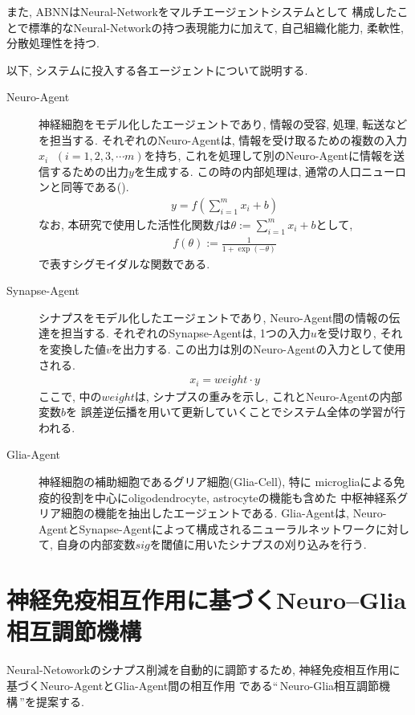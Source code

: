 また, ABNNはNeural-Networkをマルチエージェントシステムとして
構成したことで標準的なNeural-Networkの持つ表現能力に加えて, 
自己組織化能力, 柔軟性, 分散処理性を持つ.

以下, システムに投入する各エージェントについて説明する.
\begin{description}
  \item[Neuro-Agent]神経細胞をモデル化したエージェントであり, 情報の受容, 処理, 
  転送などを担当する.
  それぞれのNeuro-Agentは, 情報を受け取るための複数の入力$x_i$ $\;(i= 1, 2, 3, \cdots m)$を持ち, 
  これを処理して別のNeuro-Agentに情報を送信するための出力$y$を生成する.
  この時の内部処理は, 通常の人口ニューロンと同等である().
  \begin{align}
    y=f(\sum_{i=1}^m x_i+b)
    \label{eq:Neuro-Agent}
  \end{align}
  なお, 本研究で使用した活性化関数$f$は$\theta:=\displaystyle\sum_{i=1}^m x_i+b$として, 
  \begin{align}
    f(\theta):=\displaystyle\frac{1}{1+\exp(-\theta)}
  \end{align}
  で表すシグモイダルな関数である.
  \item[Synapse-Agent]シナプスをモデル化したエージェントであり, 
  Neuro-Agent間の情報の伝達を担当する.
  それぞれのSynapse-Agentは, 1つの入力$u$を受け取り, それを変換した値$v$を出力する. 
  この出力は別のNeuro-Agentの入力として使用される.
  \begin{align}
    x_i=weight\cdot y
 \label{eq:Synapse-Agent}   
  \end{align}
  ここで, 中の$weight$は, シナプスの重みを示し, これとNeuro-Agentの内部変数$b$を
  誤差逆伝播を用いて更新していくことでシステム全体の学習が行われる.
  \item[Glia-Agent] 神経細胞の補助細胞であるグリア細胞(Glia-Cell), 特に
  microgliaによる免疫的役割を中心にoligodendrocyte, astrocyteの機能も含めた
  中枢神経系グリア細胞の機能を抽出したエージェントである.
  Glia-Agentは, Neuro-AgentとSynapse-Agentによって構成されるニューラルネットワークに対して,
  自身の内部変数$sig$を閾値に用いたシナプスの刈り込みを行う.
\end{description}
\clearpage
\section{神経免疫相互作用に基づくNeuro--Glia相互調節機構}
Neural-Netoworkのシナプス削減を自動的に調節するため, 
神経免疫相互作用に基づくNeuro-AgentとGlia-Agent間の相互作用
である``\,Neuro-Glia相互調節機構\,''を提案する.

